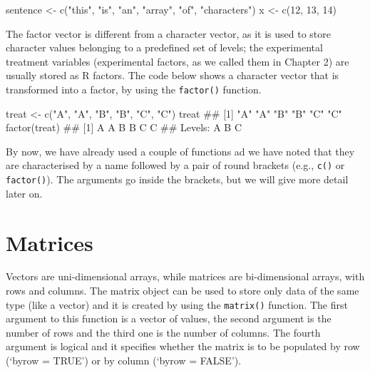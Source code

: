 \documentclass[a4paper,12pt,oneside]{book}
\newenvironment{Shaded}{\begin{snugshade}}{\end{snugshade}}
\newcommand{\DecValTok}[1]{#1}
\newcommand{\StringTok}[1]{#1}
\newcommand{\DocumentationTok}[1]{#1}
\newcommand{\OtherTok}[1]{#1}
\newcommand{\FunctionTok}[1]{#1}
\newcommand{\NormalTok}[1]{#1}
\begin{document}
\begin{Shaded}
\begin{Highlighting}[]
\NormalTok{sentence }\OtherTok{\textless{}{-}} \FunctionTok{c}\NormalTok{(}\StringTok{"this"}\NormalTok{, }\StringTok{"is"}\NormalTok{, }\StringTok{"an"}\NormalTok{, }\StringTok{"array"}\NormalTok{, }\StringTok{"of"}\NormalTok{, }\StringTok{"characters"}\NormalTok{)}
\NormalTok{x }\OtherTok{\textless{}{-}} \FunctionTok{c}\NormalTok{(}\DecValTok{12}\NormalTok{, }\DecValTok{13}\NormalTok{, }\DecValTok{14}\NormalTok{)}
\end{Highlighting}
\end{Shaded}

The factor vector is different from a character vector, as it is used to store character values belonging to a predefined set of levels; the experimental treatment variables (experimental factors, as we called them in Chapter 2) are usually stored as R factors. The code below shows a character vector that is transformed into a factor, by using the \texttt{factor()} function.

\begin{Shaded}
\begin{Highlighting}[]
\NormalTok{treat  }\OtherTok{\textless{}{-}}  \FunctionTok{c}\NormalTok{(}\StringTok{"A"}\NormalTok{, }\StringTok{"A"}\NormalTok{, }\StringTok{"B"}\NormalTok{, }\StringTok{"B"}\NormalTok{, }\StringTok{"C"}\NormalTok{, }\StringTok{"C"}\NormalTok{)}
\NormalTok{treat}
\DocumentationTok{\#\# [1] "A" "A" "B" "B" "C" "C"}
\FunctionTok{factor}\NormalTok{(treat)}
\DocumentationTok{\#\# [1] A A B B C C}
\DocumentationTok{\#\# Levels: A B C}
\end{Highlighting}
\end{Shaded}

By now, we have already used a couple of functions ad we have noted that they are characterised by a name followed by a pair of round brackets (e.g., \texttt{c()} or \texttt{factor()}). The arguments go inside the brackets, but we will give more detail later on.

\hypertarget{matrices}{%
\section{Matrices}\label{matrices}}

Vectors are uni-dimensional arrays, while matrices are bi-dimensional arrays, with rows and columns. The matrix object can be used to store only data of the same type (like a vector) and it is created by using the \texttt{matrix()} function. The first argument to this function is a vector of values, the second argument is the number of rows and the third one is the number of columns. The fourth argument is logical and it specifies whether the matrix is to be populated by row (`byrow = TRUE') or by column (`byrow = FALSE').
\end{document}
